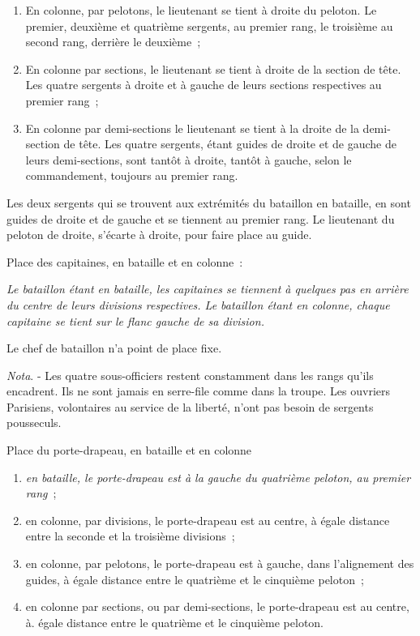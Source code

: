 \documentclass[french,twoside]{book} %
\begin{document}
\begin{enumerate}[itemsep=0pt,]
\item En colonne, par pelotons, le lieutenant se tient à droite du peloton. Le premier, deuxième et quatrième sergents, au premier rang, le troisième au second rang, derrière le deuxième ;
\item En colonne par sections, le lieutenant se tient à droite de la section de tête. Les quatre sergents à droite et à gauche de leurs sections respectives au premier rang ;
\item En colonne par demi-sections le lieutenant se tient à la droite de la demi-section de tête. Les quatre sergents, étant guides de droite et de gauche de leurs demi-sections, sont tantôt à droite, tantôt à gauche, selon le commandement, toujours au premier rang.
\end{enumerate}

\noindent Les deux sergents qui se trouvent aux extrémités du bataillon en bataille, en sont guides de droite et de gauche et se tiennent au premier rang. Le lieutenant du peloton de droite, s’écarte à droite, pour faire place au guide.\par
Place des capitaines, en bataille et en colonne :\par
{\itshape Le bataillon étant en bataille, les capitaines se tiennent à quelques pas en arrière du centre de leurs divisions respectives. Le bataillon étant en colonne, chaque capitaine se tient sur le flanc gauche de sa division.}\par
Le chef de bataillon n’a point de place fixe.\par
\emph{Nota}. - Les quatre sous-officiers restent constamment dans les rangs qu’ils encadrent. Ils ne sont jamais en serre-file comme dans la troupe. Les ouvriers Parisiens, volontaires au service de la liberté, n’ont pas besoin de sergents pousseculs.\par
Place du porte-drapeau, en bataille et en colonne\par

\begin{enumerate}[itemsep=0pt,]
\item \emph{en bataille, le porte-drapeau est à la gauche du quatrième peloton, au premier rang} ;
\item en colonne, par divisions, le porte-drapeau est au centre, à égale distance entre la seconde et la troisième divisions ;
\item en colonne, par pelotons, le porte-drapeau est à gauche, dans l’alignement des guides, à égale distance entre le quatrième et le cinquième peloton ;
\item en colonne par sections, ou par demi-sections, le porte-drapeau est au centre, à. égale distance entre le quatrième et le cinquième peloton.
\end{enumerate}
\end{document}
